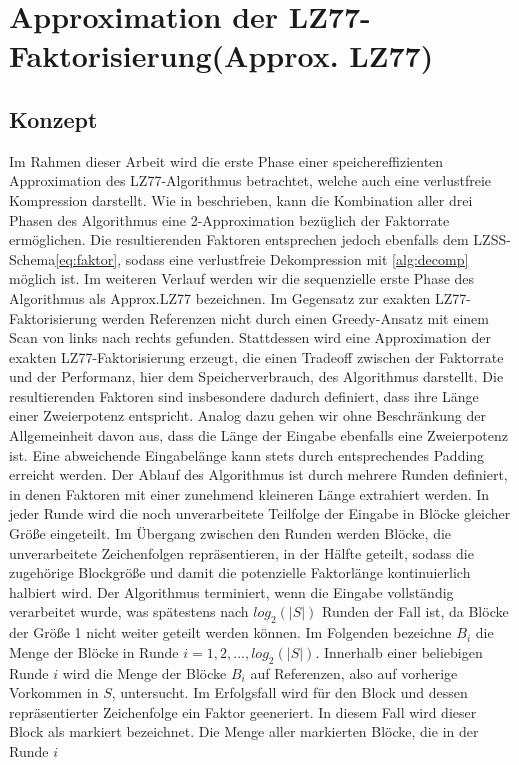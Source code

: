 \section{Approximation der LZ77-Faktorisierung(Approx. LZ77)}
\subsection{Konzept}
Im Rahmen dieser Arbeit wird die erste Phase einer speichereffizienten Approximation des LZ77-Algorithmus betrachtet, welche auch eine verlustfreie Kompression darstellt. 
Wie in \cite{ApproxLZ77} beschrieben, kann die Kombination aller drei Phasen des Algorithmus eine 2-Approximation bezüglich der Faktorrate ermöglichen. Die resultierenden 
Faktoren entsprechen jedoch ebenfalls dem LZSS-Schema\ref{eq:faktor}, sodass eine verlustfreie Dekompression mit \ref{alg:decomp} möglich ist. Im weiteren Verlauf werden wir 
die sequenzielle erste Phase des Algorithmus als Approx.LZ77 bezeichnen. Im Gegensatz zur exakten LZ77-Faktorisierung werden Referenzen nicht durch einen Greedy-Ansatz mit 
einem Scan von links nach rechts gefunden. Stattdessen wird eine Approximation der exakten LZ77-Faktorisierung erzeugt, die einen Tradeoff zwischen der Faktorrate und der Performanz,
hier dem Speicherverbrauch, des Algorithmus darstellt. Die resultierenden Faktoren sind insbesondere dadurch definiert, dass ihre Länge einer Zweierpotenz entspricht. Analog dazu 
gehen wir ohne Beschränkung der Allgemeinheit davon aus, dass die Länge der Eingabe ebenfalls eine Zweierpotenz ist. Eine abweichende Eingabelänge kann stets durch entsprechendes 
Padding erreicht werden. 
Der Ablauf des Algorithmus ist durch mehrere Runden definiert, in denen Faktoren mit einer zunehmend kleineren Länge extrahiert werden. In jeder Runde wird die noch unverarbeitete
Teilfolge der Eingabe in Blöcke gleicher Größe eingeteilt. Im Übergang zwischen den Runden werden Blöcke, die unverarbeitete Zeichenfolgen repräsentieren, in der Hälfte geteilt,
sodass die zugehörige Blockgröße und damit die potenzielle Faktorlänge kontinuierlich halbiert wird. Der Algorithmus terminiert, wenn die Eingabe vollständig verarbeitet wurde, 
was spätestens nach $log_2(|S|)$ Runden der Fall ist, da Blöcke der Größe 1 nicht weiter geteilt werden können. Im Folgenden bezeichne $B_i$ die Menge der Blöcke in Runde 
$i=1,2,...,log_2(|S|)$.
Innerhalb einer beliebigen Runde $i$ wird die Menge der Blöcke $B_i$ auf Referenzen, also auf vorherige Vorkommen in $S$, untersucht. Im Erfolgsfall wird für den Block und
dessen repräsentierter Zeichenfolge ein Faktor geeneriert. In diesem Fall wird dieser Block als markiert bezeichnet. Die Menge aller markierten Blöcke, die in der Runde $i$
